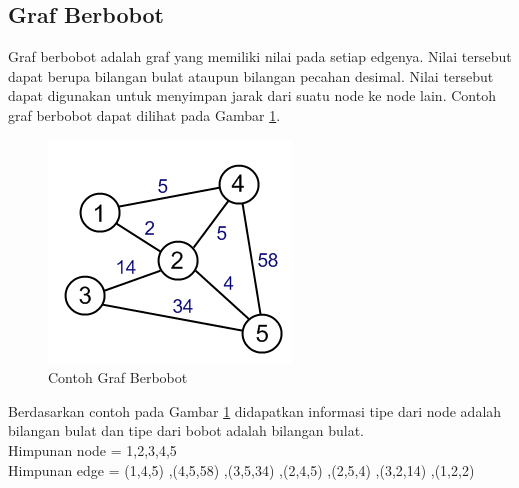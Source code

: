 \subsection{Graf Berbobot}
Graf berbobot adalah graf yang memiliki nilai pada setiap edgenya. Nilai
tersebut dapat berupa bilangan bulat ataupun bilangan pecahan desimal. Nilai
tersebut dapat digunakan untuk menyimpan jarak dari suatu node ke node lain.
Contoh graf berbobot dapat dilihat pada Gambar \ref{fig:weight_graph}.
\begin{figure}[h]
\centering
\includegraphics[scale=1]{Gambar/weight_graph}
\caption[Contoh Graf Berbobot]{Contoh Graf Berbobot}
\label{fig:weight_graph}
\end{figure}
Berdasarkan contoh pada Gambar \ref{fig:weight_graph}  didapatkan informasi tipe
dari node adalah bilangan bulat dan tipe dari bobot adalah bilangan bulat. \\
Himpunan node = {1,2,3,4,5} \\ 
Himpunan edge = {(1,4,5) ,(4,5,58) ,(3,5,34) ,(2,4,5) ,(2,5,4) ,(3,2,14) ,(1,2,2)} 

